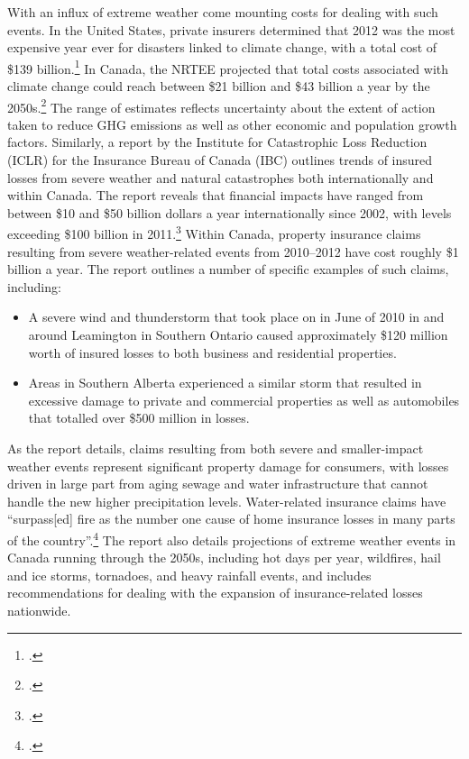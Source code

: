 \documentclass[10pt]{article}
\begin{document}
With an influx of extreme weather come mounting costs for dealing with such events. 
In the United States, private insurers determined that 2012 was the most expensive year ever for disasters linked to climate change, with a total cost of \$139 billion.\footcite[][]{BlownAway}
In Canada, the NRTEE projected that total costs associated with climate change could reach between \$21 billion and \$43 billion a year by the 2050s.\footcite[][p.15]{NRTEEPrice}
The range of estimates reflects uncertainty about the extent of action taken to reduce GHG emissions as well as other economic and population growth factors. 
Similarly, a report by the Institute for Catastrophic Loss Reduction (ICLR) for the Insurance Bureau of Canada (IBC) outlines trends of insured losses from severe weather and natural catastrophes both internationally and within Canada. 
The report reveals that financial impacts have ranged from between \$10 and \$50 billion dollars a year internationally since 2002, with levels exceeding \$100 billion in 2011.\footcite[][p. 5]{TellingWeatherStory}
Within Canada, property insurance claims resulting from severe weather-related events from 2010--2012 have cost roughly \$1 billion a year.
The report outlines a number of specific examples of such claims, including:
\begin{itemize}
	\item A severe wind and thunderstorm that took place on in June of 2010 in and around Leamington in Southern Ontario caused approximately \$120 million worth of insured losses to both business and residential properties.
	\item Areas in Southern Alberta experienced a similar storm that resulted in excessive damage to private and commercial properties as well as automobiles that totalled over \$500 million in losses.
\end{itemize}
As the report details, claims resulting from both severe and smaller-impact weather events represent significant property damage for consumers, with losses driven in large part from aging sewage and water infrastructure that cannot handle the new higher precipitation levels. Water-related insurance claims have ``surpass[ed] fire as the number one cause of home insurance losses in many parts of the country''.\footcite[][p. 7]{TellingWeatherStory}
The report also details projections of extreme weather events in Canada running through the 2050s, including hot days per year, wildfires, hail and ice storms, tornadoes, and heavy rainfall events, and includes recommendations for dealing with the expansion of insurance-related losses nationwide.
\end{document}
